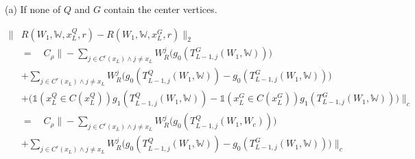 {\stab
(a) If none of $Q$ and $G$ contain the center vertices.

\begin{equation*}\begin{aligned}
		\|&R(W_1,\mathds{W},x^Q_L,r)-R(W_1,\mathds{W},x^G_L,r)\|_2 \\
		&=\quad C_\rho\bigg\| - \sum_{j\in C^r(x_L)\land j \neq x_L}
		W^j_R\bigg(g_0(T^G_{L-1,j}(W_1,\mathds{W})) \bigg) \\
		&+\sum_{j\in C^r(x_L)\land j \neq x_L}W^j_R\bigg(g_0(T^Q_{L-1,j}(W_1,
		\mathds{W})) -g_0(T^G_{L-1,j}(W_1,\mathds{W}))\bigg) \\
		&+ \bigg(\mathds{1}(x^Q_L\in C(x^Q_L))g_1(T^Q_{L-1,j}(W_1,\mathds{W})) 
		-
		\mathds{1}(x^G_L\in 
		C(x^G_L))g_1(T^G_{L-1,j}(W_1,\mathds{W}))\bigg)\bigg\|_c \\
		&=\quad C_\rho\bigg\|-\sum_{j\in C^r(x_L)\land j \neq x_L}
		W^j_R\bigg(g_0(T^Q_{L-1,j}(W_1,W_c)) \bigg) \\
		&+\sum_{j\in C^r(x_L)\land j \neq x_L}W^j_R\bigg(g_0(T^Q_{L-1,j}(W_1,
		\mathds{W})) -g_0(T^G_{L-1,j}(W_1,\mathds{W}))\bigg) \bigg\|_c \\
\end{aligned}\end{equation*}


\eat{
	
}}
